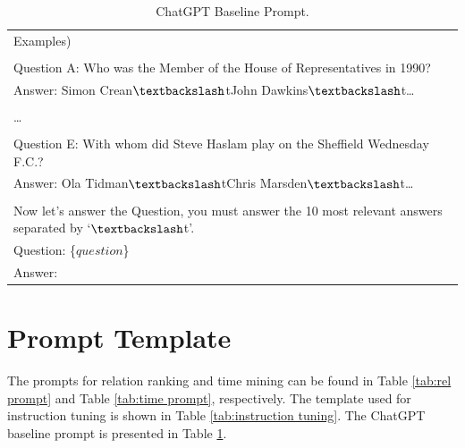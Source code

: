 \documentclass[11pt]{article}
\begin{document}
\begin{table}[ht]
{\begin{tabular}{|l|}
     \\
    Examples)\\
    \\
    Question A: Who was the Member of the House of Representatives in 1990?\\
    Answer: Simon Crean$\textbackslash$tJohn Dawkins$\textbackslash$t\dots\\
    \\
    \dots\\
    \\
    Question E: With whom did Steve Haslam play on the Sheffield Wednesday F.C.?\\
    Answer: Ola Tidman$\textbackslash$tChris Marsden$\textbackslash$t\dots\\
    \\
    Now let's answer the Question, you must answer the 10 most relevant answers separated by `$\textbackslash$t'.\\
    Question: \{$question$\} \\
    Answer:\\
    \bottomrule
    \end{tabular}}
    \caption{ChatGPT Baseline Prompt.}
\label{tab:chatgpt prompt}
\end{table}



\section{Prompt Template} \label{appendix:prompt}

The prompts for relation ranking and time mining can be found in Table \ref{tab:rel prompt} and Table \ref{tab:time prompt}, respectively.
The template used for instruction tuning is shown in Table \ref{tab:instruction tuning}. 
The ChatGPT baseline prompt is presented in Table \ref{tab:chatgpt prompt}.
\end{document}

